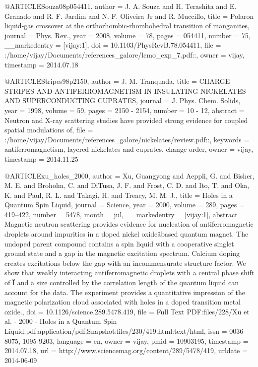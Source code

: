 @ARTICLE{Souza08p054411,
  author = {J. A. Souza and H. Terashita and E. Granado and R. F. Jardim and
	N. F. Oliveira Jr and R. Muccillo},
  title = {Polaron liquid-gas crossover at the orthorhombic-rhombohedral transition
	of manganites},
  journal = {Phys. Rev.},
  year = {2008},
  volume = {78},
  pages = {054411},
  number = {75},
  __markedentry = {[vijay:1]},
  doi = {10.1103/PhysRevB.78.054411},
  file = {:/home/vijay/Documents/references_galore/lcmo_exp_7.pdf::},
  owner = {vijay},
  timestamp = {2014.07.18}
}

@ARTICLE{Stripes98p2150,
  author = {J. M. Tranquada},
  title = {CHARGE STRIPES AND ANTIFERROMAGNETISM IN INSULATING NICKELATES AND
	SUPERCONDUCTING CUPRATES},
  journal = {J. Phys. Chem. Solids},
  year = {1998},
  volume = {59},
  pages = {2150 - 2154},
  number = {10 - 12},
  abstract = {Neutron and X-ray scattering studies have provided strong evidence
	for coupled spatial modulations of},
  file = {:/home/vijay/Documents/references_galore/nickelates/review.pdf::},
  keywords = {antiferromagnetism, layered nickelates and cuprates, change order},
  owner = {vijay},
  timestamp = {2014.11.25}
}

@ARTICLE{xu_holes_2000,
  author = {Xu, Guangyong and Aeppli, G. and Bisher, M. E. and Broholm, C. and
	DiTusa, J. F. and Frost, C. D. and Ito, T. and Oka, K. and Paul,
	R. L. and Takagi, H. and Treacy, M. M. J.},
  title = {Holes in a Quantum Spin Liquid},
  journal = {Science},
  year = {2000},
  volume = {289},
  pages = {419--422},
  number = {5478},
  month = jul,
  __markedentry = {[vijay:1]},
  abstract = {Magnetic neutron scattering provides evidence for nucleation of antiferromagnetic
	droplets around impurities in a doped nickel oxideâbased quantum
	magnet. The undoped parent compound contains a spin liquid with a
	cooperative singlet ground state and a gap in the magnetic excitation
	spectrum. Calcium doping creates excitations below the gap with an
	incommensurate structure factor. We show that weakly interacting
	antiferromagnetic droplets with a central phase shift of Ï and a
	size controlled by the correlation length of the quantum liquid can
	account for the data. The experiment provides a quantitative impression
	of the magnetic polarization cloud associated with holes in a doped
	transition metal oxide.},
  doi = {10.1126/science.289.5478.419},
  file = {Full Text PDF:files/228/Xu et al. - 2000 - Holes in a Quantum Spin Liquid.pdf:application/pdf;Snapshot:files/230/419.html:text/html},
  issn = {0036-8075, 1095-9203},
  language = {en},
  owner = {vijay},
  pmid = {10903195},
  timestamp = {2014.07.18},
  url = {http://www.sciencemag.org/content/289/5478/419},
  urldate = {2014-06-09}
}

